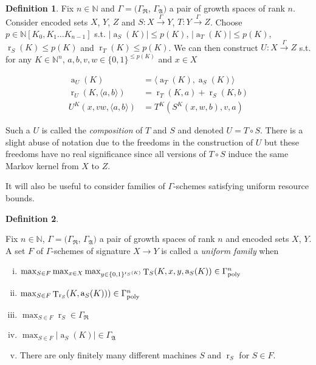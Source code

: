 \documentclass{article}
\numberwithin{equation}{section}
\theoremstyle{definition}
\newtheorem{definition}{Definition}[section]
\theoremstyle{plain}
\newcommand{\Bool}{\{0,1\}}
\DeclareMathOperator{\T}{T}
\DeclareMathOperator{\R}{r}
\DeclareMathOperator{\A}{a}
\newcommand{\Nats}{\mathbb{N}}
\newcommand{\NatPoly}{\Nats[K_0, K_1 \ldots K_{n-1}]}
\newcommand{\Abs}[1]{\lvert #1 \rvert}
\newcommand{\Chev}[1]{\langle #1 \rangle}
\newcommand{\GrowR}{\Gamma_{\mathfrak{R}}}
\newcommand{\GrowA}{\Gamma_{\mathfrak{A}}}
\newcommand{\BoolR}[1]{\Bool^{\R_{#1}(K)}}
\newcommand{\GammaPoly}{\Gamma_{\textnormal{poly}}}
\newcommand{\Scheme}{\xrightarrow{\Gamma}}
\begin{document}
\begin{samepage}
\begin{definition}

Fix $n \in \Nats$ and $\Gamma=(\GrowR$, $\GrowA)$ a pair of growth spaces of rank $n$. Consider encoded sets $X$, $Y$, $Z$ and $S: X \Scheme Y$, $T: Y \Scheme Z$. Choose $p \in \NatPoly$ s.t. $\Abs{\A_S(K)} \leq p(K)$, $\Abs{\A_T(K)} \leq p(K)$, $\R_S(K) \leq p(K)$ and $\R_T(K) \leq p(K)$. We can then construct $U: X \Scheme Z$ s.t. for any $K \in \Nats^n$, $a,b,v,w \in \Bool^{\leq p(K)}$ and $x \in X$

\begin{align}
\A_U(K) &= \Chev{\A_T(K),\A_S(K)} \\
\R_U(K, \Chev{a,b}) &= \R_T(K,a)+\R_S(K,b) \\
U^K(x,vw,\Chev{a,b}) &= T^K(S^K(x,w,b),v,a)
\end{align}

Such a $U$ is called the \emph{composition} of $T$ and $S$ and denoted $U = T \circ S$. There is a slight abuse of notation due to the freedoms in the construction of $U$ but these freedoms have no real significance since all versions of $T \circ S$ induce the same Markov kernel from $X$ to $Z$.

\end{definition}
\end{samepage}

It will also be useful to consider families of $\Gamma$-schemes satisfying uniform resource bounds.

\begin{definition}
\label{def:family}

Fix $n \in \Nats$, $\Gamma=(\GrowR$, $\GrowA)$ a pair of growth spaces of rank $n$ and encoded sets $X$, $Y$. A set $F$ of $\Gamma$-schemes of signature $X \rightarrow Y$ is called a \emph{uniform family} when

\begin{enumerate}[(i)]

\item\label{con:def__family__time} $\max_{S \in F} \max_{x \in X} \max_{y \in \BoolR{S}} \T_S(K,x,y,\A_S(K)) \in \GammaPoly^n$

\item\label{con:def__family__rtime} $\max_{S \in F}\T_{\R_S}(K,\A_S(K))) \in \GammaPoly^n$

\item\label{con:def__family__rand} $\max_{S \in F} \R_S \in \GrowR$

\item\label{con:def__family__adv} $\max_{S \in F} \Abs{\A_S(K)} \in \GrowA$

\item There are only finitely many different machines ${S}$ and ${\R_S}$ for ${S \in F}$.

\end{enumerate}

\end{definition}
\end{document}
